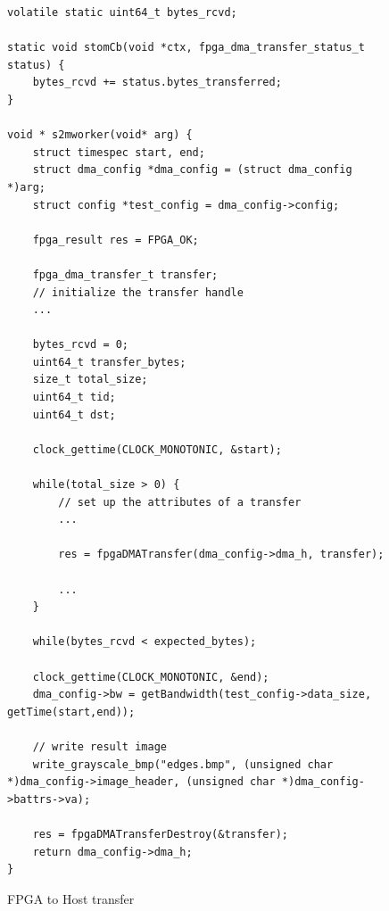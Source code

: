 \documentclass[epsfig,10pt,fullpage]{article}
\newcommand{\CommonDocsPath}{../../common/docs}
\begin{document}
\lstset{language=C,numbers=left,escapechar=\#}
\begin{figure}
\begin{center}
\begin{minipage}[h]{17.5 cm}
\begin{lstlisting}[name=C_stom]
volatile static uint64_t bytes_rcvd;

static void stomCb(void *ctx, fpga_dma_transfer_status_t status) {
	bytes_rcvd += status.bytes_transferred;
}

void * s2mworker(void* arg) {
	struct timespec start, end;
	struct dma_config *dma_config = (struct dma_config *)arg;
	struct config *test_config = dma_config->config;
	
	fpga_result res = FPGA_OK;	
	
	fpga_dma_transfer_t transfer;
    // initialize the transfer handle
    ...

	bytes_rcvd = 0;
	uint64_t transfer_bytes;
	size_t total_size;
	uint64_t tid;
	uint64_t dst;

	clock_gettime(CLOCK_MONOTONIC, &start);

	while(total_size > 0) {
		// set up the attributes of a transfer
		...
		
		res = fpgaDMATransfer(dma_config->dma_h, transfer);
		
		...
	}

	while(bytes_rcvd < expected_bytes);
	
	clock_gettime(CLOCK_MONOTONIC, &end);
	dma_config->bw = getBandwidth(test_config->data_size, getTime(start,end));

	// write result image
	write_grayscale_bmp("edges.bmp", (unsigned char *)dma_config->image_header, (unsigned char *)dma_config->battrs->va);

	res = fpgaDMATransferDestroy(&transfer);
	return dma_config->dma_h;
}
\end{lstlisting}
\end{minipage}
\caption{FPGA to Host transfer}
\label{fig:s2mworker}
\end{center}
\end{figure}


\end{document}

